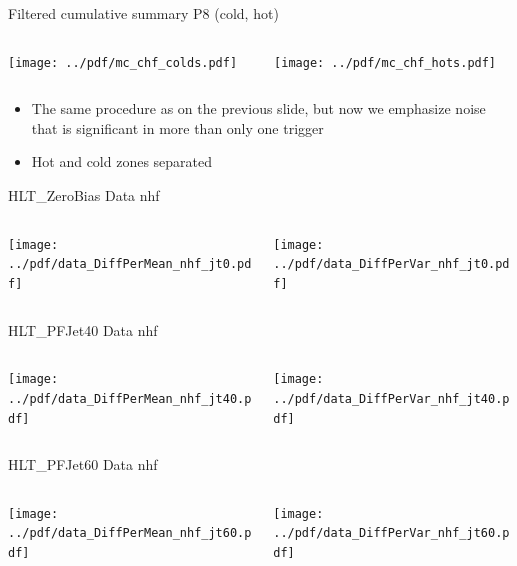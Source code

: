 \documentclass[9pt]{beamer}
\begin{document}
\begin{frame}[t]{Filtered cumulative summary P8 (cold, hot)}
\begin{columns}[T]
  \begin{column}{.5\textwidth}
  \texttt{[image: ../pdf/mc\_chf\_colds.pdf]}
  \end{column}
  \begin{column}{.5\textwidth}
  \texttt{[image: ../pdf/mc\_chf\_hots.pdf]}
  \end{column}
\end{columns}
\begin{itemize}
 \item The same procedure as on the previous slide, but now we emphasize noise that is significant in more than only one trigger
 \item Hot and cold zones separated
\end{itemize}
\end{frame}


\begin{frame}[t]{HLT\_ZeroBias Data nhf}
\begin{columns}[T]
  \begin{column}{.5\textwidth}
  \texttt{[image: ../pdf/data\_DiffPerMean\_nhf\_jt0.pdf]}
  \end{column}
  \begin{column}{.5\textwidth}
  \texttt{[image: ../pdf/data\_DiffPerVar\_nhf\_jt0.pdf]}
  \end{column}
\end{columns}
\end{frame}

\begin{frame}[t]{HLT\_PFJet40 Data nhf}
\begin{columns}[T]
  \begin{column}{.5\textwidth}
  \texttt{[image: ../pdf/data\_DiffPerMean\_nhf\_jt40.pdf]}
  \end{column}
  \begin{column}{.5\textwidth}
  \texttt{[image: ../pdf/data\_DiffPerVar\_nhf\_jt40.pdf]}
  \end{column}
\end{columns}
\end{frame}

\begin{frame}[t]{HLT\_PFJet60 Data nhf}
\begin{columns}[T]
  \begin{column}{.5\textwidth}
  \texttt{[image: ../pdf/data\_DiffPerMean\_nhf\_jt60.pdf]}
  \end{column}
  \begin{column}{.5\textwidth}
  \texttt{[image: ../pdf/data\_DiffPerVar\_nhf\_jt60.pdf]}
  \end{column}
\end{columns}
\end{frame}
\end{document}
